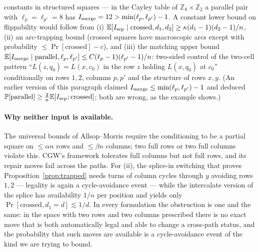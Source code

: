 constants in structured squares --- in the Cayley table of
$\mathbb Z_8\times\mathbb Z_2$ a parallel pair with
$\ell_p=\ell_{p'}=8$ has $I_{\rm merge}=12>\min(\ell_p,\ell_{p'})-1$.
A constant lower bound on flippability would follow from (i)
$\mathbb{E}[I_{\rm sep}\mid\mathrm{crossed},d_1,d_2]\ge\kappa(d_1-1)(d_2-1)/n$,
(ii) an arc-trapping bound (crossed squares have macroscopic arcs
except with probability $\le\Pr[\mathrm{crossed}]-c$), and (iii) the
matching upper bound
$\mathbb{E}[I_{\rm merge}\mid\mathrm{parallel},\ell_p,\ell_{p'}]\le
C(\ell_p-1)(\ell_{p'}-1)/n$: two-sided control of the two-cell pattern
``$L(z,q_0)=L(x,c_0)$ in the row $z$ holding $L(x,q_0)$ at $c_0$''
conditionally on rows $1,2$, columns $p,p'$ and the structure of rows
$x,y$.  (An earlier version of this paragraph claimed
$I_{\rm merge}\le\min(\ell_p,\ell_{p'})-1$ and deduced
$\mathbb{P}[\mathrm{parallel}]\ge\frac2n\mathbb{E}[I_{\rm sep};\mathrm{crossed}]$;
both are wrong, as the example shows.)

\paragraph{Why neither input is available.}  The universal bounds of
Allsop--Morris require the conditioning to be a partial square on
$\le\alpha n$ rows and $\le\beta n$ columns; two full rows or two full
columns violate this.  CGW's framework tolerates full columns but not
full rows, and its repair moves fail across the paths.  For (ii), the
splice-in switching that proves Proposition~\ref{prop:trapped} needs
turns of column cycles through $y$ avoiding rows $1,2$ --- legality is
again a cycle-avoidance event --- while the intercalate version of the
splice has availability $1/n$ per position and yields only
$\Pr[\mathrm{crossed},d_1=d]\lesssim1/d$.  In every formulation the
obstruction is one and the same: in the space with two rows and two
columns prescribed there is no exact move that is both automatically
legal and able to change a cross-path status, and the probability
that such moves are available is a cycle-avoidance event of the kind
we are trying to bound.


